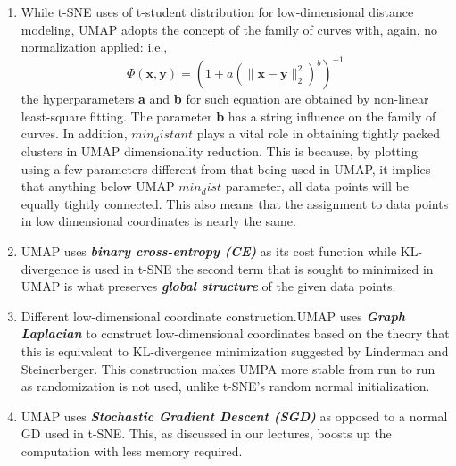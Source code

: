 \documentclass[a4paper, 11pt]{article}
\begin{document}
\begin{enumerate}
\item While t-SNE uses of t-student distribution  for low-dimensional distance modeling, UMAP adopts the concept of the family of curves with, again, no normalization applied: i.e., $$\Phi(\mathbf{x},\mathbf{y})=\left(1+a\left(\|\mathbf{x}-\mathbf{y}\|_{2}^{2}\right)^{b}\right)^{-1}$$ the hyperparameters \textbf{a} and \textbf{b} for such equation are obtained by non-linear least-square fitting. The parameter \textbf{b}  has a string influence on the family of curves. 
In addition, $min_distant$ plays a vital role in obtaining tightly packed clusters in UMAP dimensionality reduction. This is because, by plotting using a few parameters different from that being used in UMAP, it implies that anything below UMAP \textit{\textbf{$min_dist$}} parameter, all data points will be equally tightly connected. This also means that the assignment to  data points in  low dimensional coordinates  is  nearly the same. 
\item UMAP uses \textbf{\textit{binary cross-entropy (CE)}} as its cost function while KL-divergence is used in t-SNE
the second term that is sought to minimized in UMAP is what preserves \textbf{\textit{global structure}} of the given data points. 
\item Different low-dimensional coordinate construction.UMAP uses \textbf{\textit{Graph Laplacian}} to  construct low-dimensional coordinates based on the theory that this is equivalent to KL-divergence minimization  suggested by Linderman and Steinerberger. This construction makes UMPA more stable from run to run as randomization is not used, unlike t-SNE's random normal initialization. 

\item UMAP uses  \textbf{\textit{Stochastic Gradient Descent (SGD) }} as opposed to a normal GD used in t-SNE. This, as  discussed in our lectures, boosts up the computation with less memory required. 
\end{enumerate}
\end{document}
